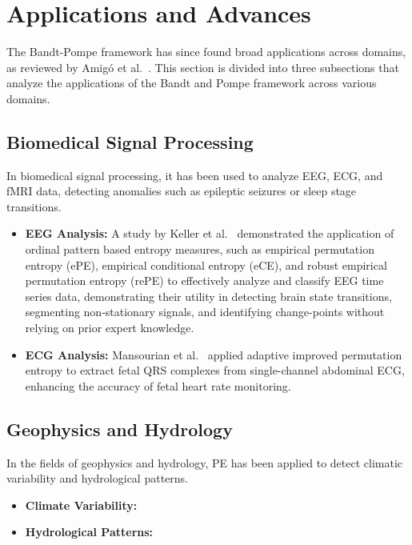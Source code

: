 \section{Applications and Advances}

The Bandt-Pompe framework has since found broad applications across domains, as reviewed by Amigó et al.~\cite{amigo2023ordinal}. 
This section is divided into three subsections that analyze the applications of the Bandt and Pompe framework across various domains.

\subsection{Biomedical Signal Processing}
In biomedical signal processing, it has been used to analyze EEG, ECG, and fMRI data, detecting anomalies such as epileptic seizures or sleep stage transitions. 
\begin{itemize}
	\item \textbf{EEG Analysis:} A study by Keller et al.~\cite{Keller2014} demonstrated the application of ordinal pattern based entropy measures, such as empirical permutation entropy (ePE), empirical conditional entropy (eCE), and robust empirical permutation entropy (rePE) to effectively analyze and classify EEG time series data, demonstrating their utility in detecting brain state transitions, segmenting non-stationary signals, and identifying change-points without relying on prior expert knowledge.
	
	\item \textbf{ECG Analysis:} Mansourian et al.~\cite{Mansourian2024} applied adaptive improved permutation entropy to extract fetal QRS complexes from single-channel abdominal ECG, enhancing the accuracy of fetal heart rate monitoring.
\end{itemize}

\subsection{Geophysics and Hydrology}
In the fields of geophysics and hydrology, PE has been applied to detect climatic variability and hydrological patterns.
\begin{itemize}
	\item \textbf{Climate Variability:}
	
	\item \textbf{Hydrological Patterns:}
\end{itemize}

